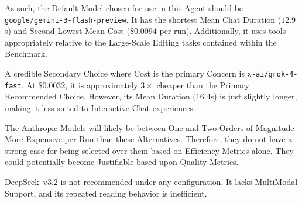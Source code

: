 As such, the Default Model chosen for use in this Agent should be \texttt{google/gemini-3-flash-preview}.
It has the shortest Mean Chat Duration ($12.9$s) and Second Lowest Mean Cost ($\$0.0094$ per run).
Additionally, it uses tools appropriately relative to the Large-Scale Editing tasks contained within the Benchmark.

A credible Secondary Choice where Cost is the primary Concern is \texttt{x-ai/grok-4-fast}.
At $\$0.0032$, it is approximately $3\times$ cheaper than the Primary Recommended Choice.
However, its Mean Duration ($16.4$s) is just slightly longer, making it less suited to Interactive Chat experiences.

The Anthropic Models will likely be between One and Two Orders of Magnitude More Expensive per Run than these Alternatives.
Therefore, they do not have a strong case for being selected over them based on Efficiency Metrics alone.
They could potentially become Justifiable based upon Quality Metrics.

DeepSeek~v3.2 is not recommended under any configuration.
It lacks MultiModal Support, and its repeated reading behavior is inefficient.
